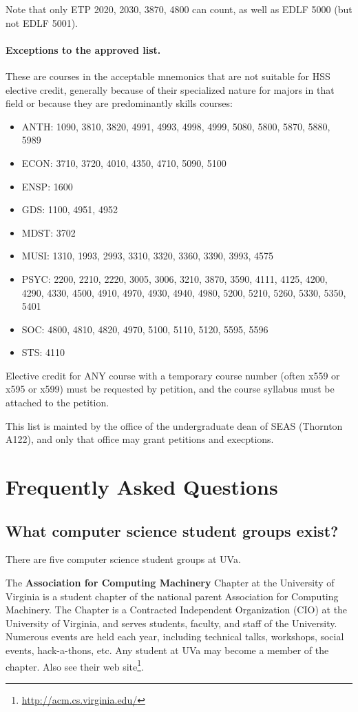 \documentclass[10pt,letter,twocolumn]{book}
\newenvironment{itemlist}{
\begin{itemize}
\setlength{\itemsep}{0pt}
\setlength{\parskip}{0pt}}
{\end{itemize}}
\newcommand{\mysection}[1]{\section{#1}\renewcommand{\rightmark}{#1}}
\newcommand{\myurl}[1]{\footnote{\scriptsize\url{#1}}}
\begin{document}
Note that only ETP 2020, 2030, 3870, 4800 can count, as well as EDLF
5000 (but not EDLF 5001).

\paragraph{Exceptions to the approved list.} These are courses in the
acceptable mnemonics that are not suitable for HSS elective credit,
generally because of their specialized nature for majors in that field
or because they are predominantly skills courses:

\begin{itemlist}
\item ANTH: 1090, 3810, 3820, 4991, 4993, 4998, 4999, 5080, 5800, 5870,
5880, 5989
\item ECON: 3710, 3720, 4010, 4350, 4710, 5090, 5100
\item ENSP: 1600
\item GDS: 1100, 4951, 4952
\item MDST: 3702
\item MUSI: 1310, 1993, 2993, 3310, 3320, 3360, 3390, 3993, 4575
\item PSYC: 2200, 2210, 2220, 3005, 3006, 3210, 3870, 3590, 4111, 4125,
4200, 4290, 4330, 4500, 4910, 4970, 4930, 4940, 4980, 5200, 5210,
5260, 5330, 5350, 5401
\item SOC: 4800, 4810, 4820, 4970, 5100, 5110, 5120, 5595, 5596
\item STS: 4110
\end{itemlist}

Elective credit for ANY course with a temporary course number
(often x559 or x595 or x599) must be requested by petition, and
the course syllabus must be attached to the petition.

This list is mainted by the office of the undergraduate dean of SEAS
(Thornton A122), and only that office may grant petitions and
execptions.

\mysection{Frequently Asked Questions}

\subsection{What computer science student groups exist?}

There are five computer science student groups at UVa.

The {\bf Association for Computing Machinery} Chapter at the
University of Virginia is a student chapter of the national parent
Association for Computing Machinery. The Chapter is a Contracted
Independent Organization (CIO) at the University of Virginia, and
serves students, faculty, and staff of the University. Numerous events
are held each year, including technical talks, workshops, social
events, hack-a-thons, etc.  Any student at UVa may become a member of
the chapter.  Also see their web
site\myurl{http://acm.cs.virginia.edu/}.
\end{document}
